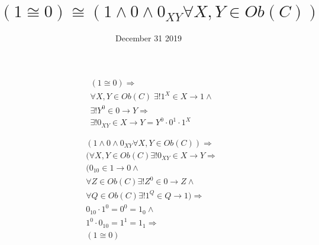 \documentclass[11pt]{article}
\date{December 31 2019}
\title{$(1 \cong 0) \cong (1 \land 0 \land 0_{XY} \forall X, Y \in Ob(C))$}
\begin{document}
\maketitle

\begin{equation}
\tag{to}
\begin{aligned}
& (1 \cong 0) \Rightarrow \\
& \forall X, Y \in Ob(C)\; \exists! 1^{X} \in X \rightarrow 1 \land \\
& \exists! Y^{0} \in 0 \rightarrow Y \Rightarrow \\
& \exists! 0_{XY} \in X \rightarrow Y = Y^{0} \cdot 0^{1} \cdot 1^{X}
\end{aligned}
\end{equation}

\begin{equation}
\tag{from}
\begin{aligned}
& (1 \land 0 \land 0_{XY} \forall X, Y \in Ob(C)) \Rightarrow \\
& (\forall X, Y \in Ob(C) \exists! 0_{XY} \in X \rightarrow Y \Rightarrow \\
& (0_{10} \in 1 \rightarrow 0 \land \\
& \forall Z \in Ob(C) \exists! Z^{0} \in 0 \rightarrow Z \land \\
& \forall Q \in Ob(C) \exists! 1^{Q} \in Q \rightarrow 1) \Rightarrow \\
& 0_{10} \cdot 1^{0} = 0^{0} = 1_{0} \land \\
& 1^{0} \cdot 0_{10} = 1^{1} = 1_{1} \Rightarrow \\
& (1 \cong 0)
\end{aligned}
\end{equation}
\end{document}
